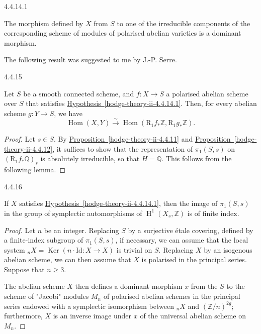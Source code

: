     \begin{hypothesis}{4.4.14.1}\label{hodge-theory-ii-4.4.14.1}\skipsinglepar\par{}The morphism defined by \(X\) from \(S\) to one of the irreducible components of the corresponding scheme of modules of polarised abelian varieties is a dominant morphism.\end{hypothesis}

    \par{}The following result was suggested to me by J.-P. Serre.\begin{corollary}{4.4.15}\label{hodge-theory-ii-4.4.15}\skipsinglepar\par{}Let \(S\) be a smooth connected scheme, and \(f\colon  X\to  S\) a polarised abelian scheme over \(S\) that satisfies \hyperref[hodge-theory-ii-4.4.14.1]{Hypothesis~\ref*{hodge-theory-ii-4.4.14.1}}.
    Then, for every abelian scheme \(g\colon  Y\to  S\), we have
    \[       \operatorname {Hom}(X,Y)       \xrightarrow {\sim } \operatorname {Hom}(\mathrm {R}_1f_*\mathbb {Z},\mathrm {R}_1g_*\mathbb {Z}).     \]\begin{proof}\par{}Let \(s\in  S\).
      By \hyperref[hodge-theory-ii-4.4.11]{Proposition~\ref*{hodge-theory-ii-4.4.11}} and \hyperref[hodge-theory-ii-4.4.12]{Proposition~\ref*{hodge-theory-ii-4.4.12}}, it suffices to show that the representation of \(\pi _1(S,s)\) on \((\mathrm {R}_1f_*\mathbb {Q})_s\) is absolutely irreducible, so that \(H=\mathbb {Q}\).
      This follows from the following lemma.\end{proof}\end{corollary}\begin{lemma}{4.4.16}\label{hodge-theory-ii-4.4.16}\skipsinglepar\par{}If \(X\) satisfies \hyperref[hodge-theory-ii-4.4.14.1]{Hypothesis~\ref*{hodge-theory-ii-4.4.14.1}}, then the image of \(\pi _1(S,s)\) in the group of symplectic automorphisms of \(\operatorname {H}^1(X_s,\mathbb {Z})\) is of finite index.\begin{proof}\par{}Let \(n\) be an integer.
      Replacing \(S\) by a surjective étale covering, defined by a finite-index subgroup of \(\pi _1(S,s)\), if necessary, we can assume that the local system \({}_nX=\operatorname {Ker}(n\cdot \mathrm {Id}\colon  X\to  X)\) is trivial on \(S\).
      Replacing \(X\) by an isogenous abelian scheme, we can then assume that \(X\) is polarised in the principal series.
      Suppose that \(n\geqslant  3\).\par{}The abelian scheme \(X\) then defines a dominant morphism \(x\) from the \(S\) to the scheme of "Jacobi" modules \(M_n\) of polarised abelian schemes in the principal series endowed with a symplectic isomorphism between \({}_nX\) and \((\mathbb {Z}{/}n)^{2g}\);
      furthermore, \(X\) is an inverse image under \(x\) of the universal abelian scheme on \(M_n\).
      

\end{proof}
\end{lemma}
